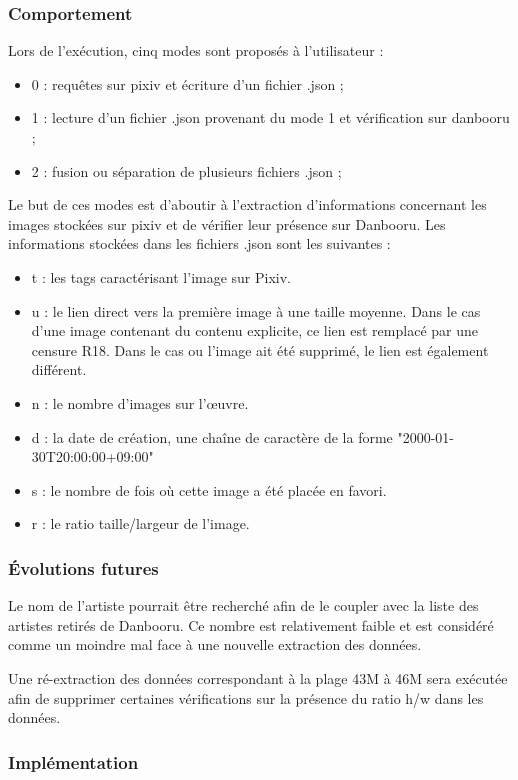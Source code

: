 \documentclass[a4paper,12pt]{article}
\begin{document}
\subsubsection{Comportement}
Lors de l'exécution, cinq modes sont proposés à l'utilisateur :
\begin{itemize}
\item 0 : requêtes sur pixiv et écriture d'un fichier .json ;
\item 1 : lecture d'un fichier .json provenant du mode 1 et vérification sur danbooru ;
\item 2 : fusion ou séparation de plusieurs fichiers .json ;
\end{itemize}

Le but de ces modes est d'aboutir à l'extraction d'informations concernant les images stockées sur pixiv et de vérifier leur présence sur Danbooru. 
Les informations stockées dans les fichiers .json sont les suivantes :
\begin{itemize}
\item t : les tags caractérisant l'image sur Pixiv.
\item u : le lien direct vers la première image à une taille moyenne. Dans le cas d'une image contenant du contenu explicite, ce lien est remplacé par une censure R18. Dans le cas ou l'image ait été supprimé, le lien est également différent.
\item n : le nombre d'images sur l'œuvre.
\item d : la date de création, une chaîne de caractère de la forme "2000-01-30T20:00:00+09:00"
\item s : le nombre de fois où cette image a été placée en favori.
\item r : le ratio taille/largeur de l'image.
\end{itemize} 
\subsubsection{Évolutions futures}
Le nom de l'artiste pourrait être recherché afin de le coupler avec la liste des artistes retirés de Danbooru. Ce nombre est relativement faible et est considéré comme un moindre mal face à une nouvelle extraction des données.

Une ré-extraction des données correspondant à la plage 43M à 46M sera exécutée afin de supprimer certaines vérifications sur la présence du ratio h/w dans les données.
\subsubsection{Implémentation}
\end{document}
